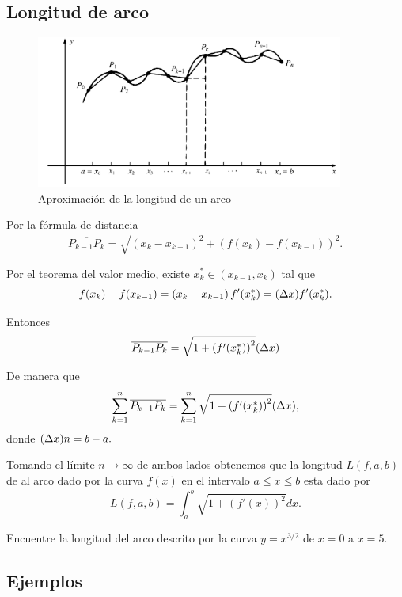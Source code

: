 \subsection{Longitud de arco}


\begin{figure}
 \centering
 \includegraphics[height=5cm,keepaspectratio=true]{./calculo/fig2908.png}
 \caption{Aproximación de la longitud de un arco}
 \label{fig:2908}
\end{figure}




Por la f\'ormula de distancia
$$
\overline{P_{k-1}P_{k}}=\sqrt{
\left( x_{k}-x_{k-1} \right)^{2}+
\left( f(x_{k})-f(x_{k-1}) \right)^{2}.
}
$$


Por el teorema del valor medio, existe $x_{k}^{*}\in(x_{k-1},x_{k})$ tal que
$$
f(x_{k})-f(x_{k-1})=\left( x_{k}-x_{k-1} \right)f'(x_{k}^{*})=(\Delta x)f'(x_{k}^{*}).
$$

Entonces
$$
\overline{P_{k-1}P_{k}}=\sqrt{1+\left( f'(x_{k}^{*}) \right)^{2}}(\Delta x)
$$



De manera que
$$
\sum_{k=1}^{n}\overline{P_{k-1}P_{k}}=
\sum_{k=1}^{n}\sqrt{1+\left( f'(x_{k}^{*}) \right)^{2}}(\Delta x),
$$ donde $(\Delta x)n=b-a.$


Tomando el l\'imite $n \to \infty$ de ambos lados obtenemos que la longitud $L(f,a,b)$ de al arco dado por la curva $f(x)$ en el intervalo $a\leq x \leq b$ esta dado por
\[
 \label{29.2}
 L(f,a,b)=\int_{a}^{b}\sqrt{1+(f'(x))^{2}}dx.
\]




\begin{resuelto}
 Encuentre la longitud del arco descrito por la curva $y=x^{3/2}$ de $x=0$ a $x=5.$
\end{resuelto}



\subsection{Ejemplos}

